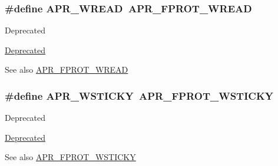 \subsubsection[{\texorpdfstring{A\+P\+R\+\_\+\+W\+R\+E\+AD}{APR_WREAD}}]{\setlength{\rightskip}{0pt plus 5cm}\#define A\+P\+R\+\_\+\+W\+R\+E\+AD~{\bf A\+P\+R\+\_\+\+F\+P\+R\+O\+T\+\_\+\+W\+R\+E\+AD}}\hypertarget{group__apr__file__permissions_ga5c987d2b1ace95b4ffa7c5a322721aad}{}\label{group__apr__file__permissions_ga5c987d2b1ace95b4ffa7c5a322721aad}
\begin{DoxyRefDesc}{Deprecated}
\item[\hyperlink{deprecated__deprecated000019}{Deprecated}]\end{DoxyRefDesc}
\begin{DoxySeeAlso}{See also}
\hyperlink{group__apr__file__permissions_ga194718630250b0f0dd4be38c86dac717}{A\+P\+R\+\_\+\+F\+P\+R\+O\+T\+\_\+\+W\+R\+E\+AD} 
\end{DoxySeeAlso}
\subsubsection[{\texorpdfstring{A\+P\+R\+\_\+\+W\+S\+T\+I\+C\+KY}{APR_WSTICKY}}]{\setlength{\rightskip}{0pt plus 5cm}\#define A\+P\+R\+\_\+\+W\+S\+T\+I\+C\+KY~{\bf A\+P\+R\+\_\+\+F\+P\+R\+O\+T\+\_\+\+W\+S\+T\+I\+C\+KY}}\hypertarget{group__apr__file__permissions_ga824d6685d59e3efddb6ee7fdbee69c13}{}\label{group__apr__file__permissions_ga824d6685d59e3efddb6ee7fdbee69c13}
\begin{DoxyRefDesc}{Deprecated}
\item[\hyperlink{deprecated__deprecated000018}{Deprecated}]\end{DoxyRefDesc}
\begin{DoxySeeAlso}{See also}
\hyperlink{group__apr__file__permissions_ga989dbea02f779a5f20a643d7e4ee9952}{A\+P\+R\+\_\+\+F\+P\+R\+O\+T\+\_\+\+W\+S\+T\+I\+C\+KY} 
\end{DoxySeeAlso}
